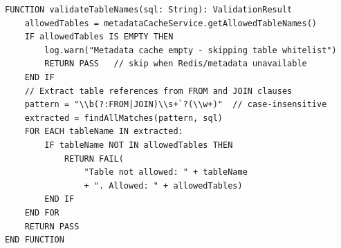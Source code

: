 \vspace{3mm}

\begin{table}[H]
\small\singlespacing
\centering
\caption{Pseudocode --- validateTableNames() Table Whitelist Verification (Layer 3)}
\label{tab:pseudocode-validate-tables}
\vspace{2mm}

\begin{lstlisting}
FUNCTION validateTableNames(sql: String): ValidationResult
    allowedTables = metadataCacheService.getAllowedTableNames()
    IF allowedTables IS EMPTY THEN
        log.warn("Metadata cache empty - skipping table whitelist")
        RETURN PASS   // skip when Redis/metadata unavailable
    END IF
    // Extract table references from FROM and JOIN clauses
    pattern = "\\b(?:FROM|JOIN)\\s+`?(\\w+)"  // case-insensitive
    extracted = findAllMatches(pattern, sql)
    FOR EACH tableName IN extracted:
        IF tableName NOT IN allowedTables THEN
            RETURN FAIL(
                "Table not allowed: " + tableName
                + ". Allowed: " + allowedTables)
        END IF
    END FOR
    RETURN PASS
END FUNCTION
\end{lstlisting}
\end{table}


\vspace{3mm}

